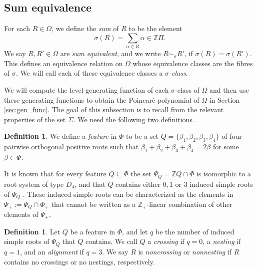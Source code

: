 \documentclass[11pt]{amsart}
\theoremstyle{plain}
\theoremstyle{definition}
\newtheorem{defn}[theorem]{Definition}
\theoremstyle{remark}
\numberwithin{equation}{section}
\newcommand{\al}{\alpha}
\newcommand{\be}{\beta}
\newcommand{\Z}{{\mathbb Z}}
\newcommand{\ob}{\Omega}
\newcommand{\se}{\subseteq}
\begin{document}
\subsection{Sum equivalence}
\label{sec:sums}
For each $R\in \ob$, we define the \emph{sum} of $R$ to be the element
\[
\sigma(R)=\sum_{\al\in R}\al\in \Z\Pi.
\]
We say $R, R'\in \ob$ are \emph{sum equivalent}, and we write $R\sim_\sigma R'$,
if $\sigma(R)=\sigma(R')$. This defines an equivalence relation on $\ob$ whose
equivalence classes are the fibres of $\sigma$. We will call each of these
equivalence classes a \emph{$\sigma$-class}.

We will compute the level generating function of each $\sigma$-class of $\ob$
and then use these generating functions to obtain the Poincar\'e polynomial of
$\ob$ in Section \ref{sec:gen_func}.  The goal of this subsection is to recall
from \cite{gx5} the relevant properties of the set $\Sigma$. We need the
following two definitions.


\begin{defn}
\label{defn:feature}
We define a \emph{feature} in $\Phi$ to be a set $Q=\{\be_1,\be_2,\be_3,\be_4\}$
of four pairwise orthogonal positive roots such that $\be_1+\be_2+\be_3+\be_4=2\be$ for
some $\be\in \Phi$. 
\end{defn}

It is known that for every feature $Q\se \Phi$ the set $\Psi_{Q}=\Z Q\cap \Phi$
is isomorphic to a root system of type $D_4$, and that $Q$ contains either $0,1$
or $3$ induced simple roots of $\Psi_Q$ \cite[Remark 2.14]{gx6}. These induced
simple roots can be characterized as the elements in $\Psi_+:=\Psi_Q\cap\Phi_+$
that cannot be written as a $\Z_+$-linear combination of other elements of
$\Psi_+$.

\begin{defn} \label{def:cna} 
  Let $Q$ be a feature in $\Phi$, and let $q$ be the number of induced simple
  roots of $\Psi_Q$ that $Q$ contains. We call $Q$ a \emph{crossing} if $q=0$, a
  \emph{nesting} if $q=1$, and an \emph{alignment} if $q=3$. We say $R$ is
  \emph{noncrossing} or \emph{nonnesting} if $R$ contains no crossings or no
  nestings, respectively. 
\end{defn}
\end{document}

